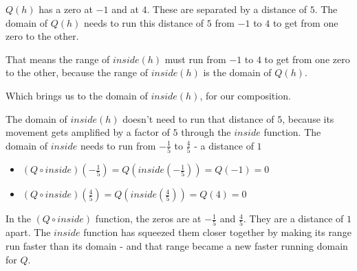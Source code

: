 \documentclass{ximera}
\begin{document}
\begin{observation}






$Q(h)$ has a zero at $-1$ and at $4$.  These are separated by a distance of $5$. The domain of $Q(h)$ needs to run this distance of $5$ from $-1$ to $4$ to get from one zero to the other.


That means the range of $inside(h)$ must run from  $-1$ to $4$ to get from one zero to the other, because the range of $inside(h)$ is the domain of $Q(h)$.

Which brings us to the domain of $inside(h)$, for our composition. 

The domain of $inside(h)$ doesn't need to run that distance of $5$, because its movement gets amplified by a factor of $5$ through the $inside$ function.  The domain of $inside$ needs to run from $-\frac{1}{5}$ to $\frac{4}{5}$ - a distance of $1$




\begin{itemize}
\item $(Q \circ inside)\left(-\frac{1}{5}\right) = Q\left(inside\left(-\frac{1}{5}\right)\right) = Q(-1) = 0$
\item $(Q \circ inside)\left(\frac{4}{5}\right) = Q\left(inside\left(\frac{4}{5}\right)\right) = Q(4) = 0$
\end{itemize}


In the $(Q \circ inside)$ function, the zeros are at $-\frac{1}{5}$ and $\frac{4}{5}$.  They are a distance of $1$ apart.  The $inside$ function has squeezed them closer together by making its range run faster than its domain - and that range became a new faster running domain for $Q$.




\end{observation}
\end{document}
